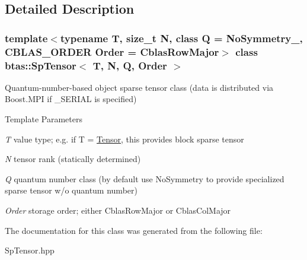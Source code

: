 \subsection{Detailed Description}
\subsubsection*{template$<$typename T, size\_\-t N, class Q = NoSymmetry\_\-, CBLAS\_\-ORDER Order = CblasRowMajor$>$ class btas::SpTensor$<$ T, N, Q, Order $>$}

Quantum-\/number-\/based object sparse tensor class (data is distributed via Boost.MPI if \_\-SERIAL is specified) 
\begin{DoxyTemplParams}{Template Parameters}
\item[{\em T}]value type; e.g. if T = \hyperlink{classbtas_1_1_tensor}{Tensor}, this provides block sparse tensor \item[{\em N}]tensor rank (statically determined) \item[{\em Q}]quantum number class (by default use NoSymmetry to provide specialized sparse tensor w/o quantum number) \item[{\em Order}]storage order; either CblasRowMajor or CblasColMajor \end{DoxyTemplParams}


The documentation for this class was generated from the following file:\begin{DoxyCompactItemize}
\item 
SpTensor.hpp\end{DoxyCompactItemize}
